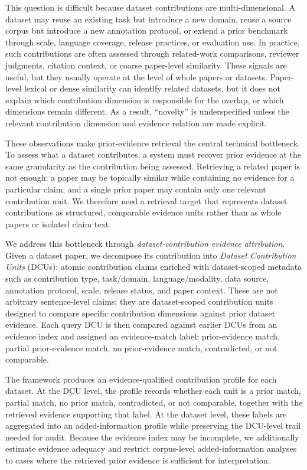 \documentclass[11pt]{article}
\begin{document}
This question is difficult because dataset contributions are multi-dimensional.
A dataset may reuse an existing task but introduce a new domain, reuse a source corpus but introduce a new annotation protocol, or extend a prior benchmark through scale, language coverage, release practices, or evaluation use.
In practice, such contributions are often assessed through related-work comparisons, reviewer judgments, citation context, or coarse paper-level similarity.
These signals are useful, but they usually operate at the level of whole papers or datasets.
Paper-level lexical or dense similarity can identify related datasets, but it does not explain which contribution dimension is responsible for the overlap, or which dimensions remain different.
As a result, ``novelty'' is underspecified unless the relevant contribution dimension and evidence relation are made explicit.

These observations make prior-evidence retrieval the central technical bottleneck.
To assess what a dataset contributes, a system must recover prior evidence at the same granularity as the contribution being assessed.
Retrieving a related paper is not enough: a paper may be topically similar while containing no evidence for a particular claim, and a single prior paper may contain only one relevant contribution unit.
We therefore need a retrieval target that represents dataset contributions as structured, comparable evidence units rather than as whole papers or isolated claim text.

We address this bottleneck through \emph{dataset-contribution evidence attribution}.
Given a dataset paper, we decompose its contribution into \emph{Dataset Contribution Units} (DCUs): atomic contribution claims enriched with dataset-scoped metadata such as contribution type, task/domain, language/modality, data source, annotation protocol, scale, release status, and paper context.
These are not arbitrary sentence-level claims; they are dataset-scoped contribution units designed to compare specific contribution dimensions against prior dataset evidence.
Each query DCU is then compared against earlier DCUs from an evidence index and assigned an evidence-match label: prior-evidence match, partial prior-evidence match, no prior-evidence match, contradicted, or not comparable.

The framework produces an evidence-qualified contribution profile for each dataset.
At the DCU level, the profile records whether each unit is a prior match, partial match, no prior match, contradicted, or not comparable, together with the retrieved evidence supporting that label.
At the dataset level, these labels are aggregated into an added-information profile while preserving the DCU-level trail needed for audit.
Because the evidence index may be incomplete, we additionally estimate evidence adequacy and restrict corpus-level added-information analyses to cases where the retrieved prior evidence is sufficient for interpretation.
\end{document}
